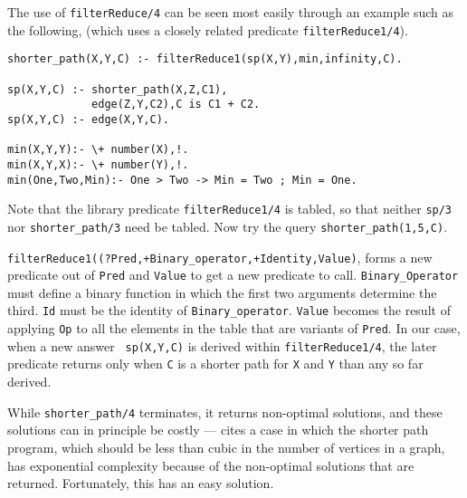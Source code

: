 \begin{exercise}
The use of {\tt filterReduce/4} can be seen most easily through an
example such as the following, (which uses a closely related predicate
{\tt filterReduce1/4}).
\begin{center}
\begin{minipage}{3.8in}
\begin{verbatim}
shorter_path(X,Y,C) :- filterReduce1(sp(X,Y),min,infinity,C).

sp(X,Y,C) :- shorter_path(X,Z,C1),
             edge(Z,Y,C2),C is C1 + C2.
sp(X,Y,C) :- edge(X,Y,C).

min(X,Y,Y):- \+ number(X),!.
min(X,Y,X):- \+ number(Y),!.
min(One,Two,Min):- One > Two -> Min = Two ; Min = One.
\end{verbatim}						       
\end{minipage}
\end{center}
Note that the library predicate {\tt filterReduce1/4} is tabled, so
that neither {\tt sp/3} nor {\tt shorter\_path/3} need be tabled.  Now
try the query {\tt shorter\_path(1,5,C)}.
\end{exercise}

{\tt filterReduce1((?Pred,+Binary\_operator,+Identity,Value)}, forms a
new predicate out of {\tt Pred} and {\tt Value} to get a new predicate
to call.  {\tt Binary\_Operator} must define a binary function in
which the first two arguments determine the third.  {\tt Id} must be
the identity of {\tt Binary\_operator}.  {\tt Value} becomes the
result of applying {\tt Op} to all the elements in the table that are
variants of {\tt Pred}.  In our case, when a new answer {\tt
sp(X,Y,C)} is derived within {\tt filterReduce1/4}, the later
predicate returns only when {\tt C} is a shorter  path for {\tt X} and
{\tt Y} than any so far derived.

While {\tt shorter\_path/4} terminates, it returns non-optimal
solutions, and these solutions can in principle be costly ---
\cite{JFLP-Scheduling} cites a case in which the shorter path program,
which should be less than cubic in the number of vertices in a graph,
has exponential complexity because of the non-optimal solutions that
are returned.  Fortunately, this has an easy solution.

